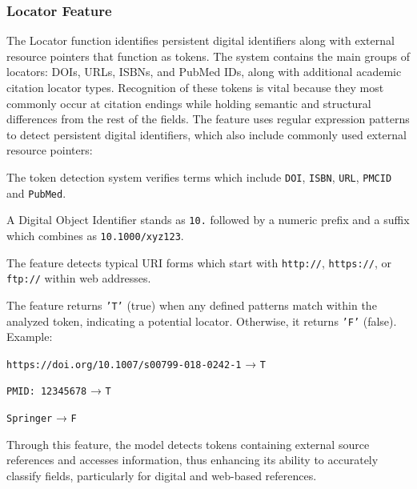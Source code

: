 \subsubsection{Locator Feature}
The Locator function identifies persistent digital identifiers along with external resource pointers that function as tokens. The system contains the main groups of locators: DOIs, URLs, ISBNs, and PubMed IDs, along with additional academic citation locator types. Recognition of these tokens is vital because they most commonly occur at citation endings while holding semantic and structural differences from the rest of the fields.
The feature uses regular expression patterns to detect persistent digital identifiers, which also include commonly used external resource pointers:
\begin{compactitem}
\item The token detection system verifies terms which include \texttt{DOI}, \texttt{ISBN}, \texttt{URL}, \texttt{PMCID} and \texttt{PubMed}.
\item A Digital Object Identifier stands as \texttt{10.} followed by a numeric prefix and a suffix which combines as \texttt{10.1000/xyz123}.
\item The feature detects typical URI forms which start with \texttt{http://}, \texttt{https://}, or \texttt{ftp://} within web addresses.
\end{compactitem}
The feature returns \texttt{'T'} (true) when any defined patterns match within the analyzed token, indicating a potential locator. Otherwise, it returns \texttt{'F'} (false).
Example:
\begin{compactitem}
\item \texttt{https://doi.org/10.1007/s00799-018-0242-1} → \texttt{T}
\item \texttt{PMID: 12345678} → \texttt{T}
\item \texttt{Springer} → \texttt{F}
\end{compactitem}
Through this feature, the model detects tokens containing external source references and accesses information, thus enhancing its ability to accurately classify fields, particularly for digital and web-based references.

